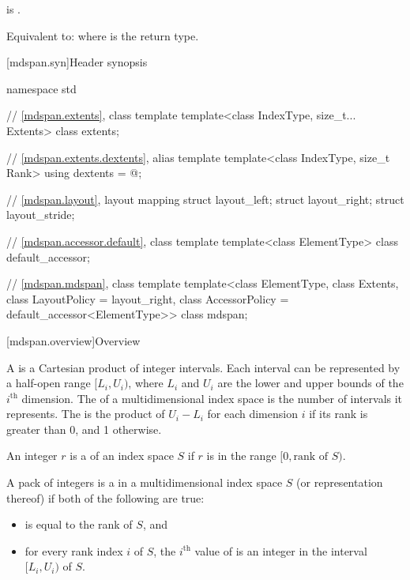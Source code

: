 \begin{itemdescr}
\pnum
\constraints
{} is .

\pnum
\effects
Equivalent to: 
where  is the return type.
\end{itemdescr}

[mdspan.syn]{Header  synopsis}

%
\begin{codeblock}
namespace std {
  // \ref{mdspan.extents}, class template 
  template<class IndexType, size_t... Extents>
    class extents;

  // \ref{mdspan.extents.dextents}, alias template 
  template<class IndexType, size_t Rank>
    using dextents = @\seebelow@;

  // \ref{mdspan.layout}, layout mapping
  struct layout_left;
  struct layout_right;
  struct layout_stride;

  // \ref{mdspan.accessor.default}, class template 
  template<class ElementType>
    class default_accessor;

  // \ref{mdspan.mdspan}, class template 
  template<class ElementType, class Extents, class LayoutPolicy = layout_right,
           class AccessorPolicy = default_accessor<ElementType>>
    class mdspan;
}
\end{codeblock}

[mdspan.overview]{Overview}

\pnum
A  is
a Cartesian product of integer intervals.
Each interval can be represented by a half-open range $[L_i, U_i)$,
where $L_i$ and $U_i$ are the lower and upper bounds of
the $i^\text{th}$ dimension.
The  of a multidimensional index space is
the number of intervals it represents.
The  is
the product of $U_i - L_i$ for each dimension $i$
if its rank is greater than 0, and 1 otherwise.

\pnum
An integer $r$ is a  of an index space $S$
if $r$ is in the range $[0, \text{rank of $S$})$.

\pnum
A pack of integers  is
a  in a multidimensional index space $S$
(or representation thereof) if both of the following are true:
\begin{itemize}
\item
{} is equal to the rank of $S$, and
\item
for every rank index $i$ of $S$,
the $i^\text{th}$ value of  is an integer
in the interval $[L_i, U_i)$ of $S$.
\end{itemize}

